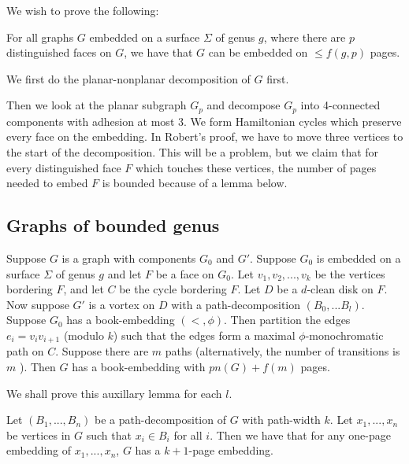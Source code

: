 We wish to prove the following:

\begin{conjecture}\label{conj:4-planar graphs}
	For all graphs $G$ embedded on a surface $\Sigma$ of genus $g$, where there are $p$ distinguished faces on $G$, we have that $G$ can be embedded on $\leq f(g, p)$ pages.
\end{conjecture}

We first do the planar-nonplanar decomposition of $G$ first. 

Then we look at the planar subgraph $G_p$ and decompose $G_p$ into 4-connected components with adhesion at most 3. We form Hamiltonian cycles which preserve every face on the embedding.
In Robert's proof, we have to move three vertices to the start of the decomposition. This will be a problem, but we claim that for every distinguished face $F$ which touches these vertices, the number of pages needed to embed $F$ is bounded because of a lemma below. 

\subsection{Graphs of bounded genus}

\begin{lemma}
	Suppose $G$ is a graph with components $G_0$ and $G'$. Suppose $G_0$ is embedded on a surface $\Sigma$ of genus $g$ and let $F$ be a face on $G_0$. Let $v_1, v_2, ..., v_k$ be the vertices bordering $F$, and let $C$ be the cycle bordering $F$. Let $D$ be a $d$-clean disk on $F$. Now suppose $G'$ is a vortex on $D$ with a path-decomposition $(B_0, ... B_l)$. Suppose $G_0$ has a book-embedding $(<, \phi)$. Then partition the edges $e_i = v_i v_{i + 1}$ (modulo $k$) such that the edges form a maximal $\phi$-monochromatic path on $C$. Suppose there are $m$ paths (alternatively, the number of transitions is $m$ ). Then $G$ has a book-embedding with $pn(G) + f(m)$ pages.
\end{lemma}
We shall prove this auxillary lemma for each $l$. 
\begin{lemma}
	Let $(B_1, ..., B_n)$ be a path-decomposition of $G$ with path-width $k$. Let $x_1, ..., x_n$ be vertices in $G$ such that $x_i \in B_i$ for all $i$. Then we have that for any one-page embedding of $x_1, ..., x_n$, $G$ has a $k + 1$-page embedding. 
\end{lemma}


